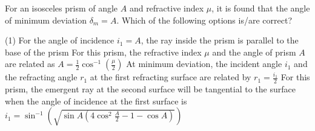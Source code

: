     \item For an isosceles prism of angle \( A \) and refractive index \( \mu \), it is found that the angle of minimum deviation \( \delta_m = A \). Which of the following options is/are correct?
        \begin{tasks}(1)
            \task For the angle of incidence \( i_1 = A \), the ray inside the prism is parallel to the base of the prism
            \task For this prism, the refractive index \( \mu \) and the angle of prism \( A \) are related as \( A = \frac{1}{2} \cos^{-1} \left( \frac{\mu}{2} \right) \)
            \task At minimum deviation, the incident angle \( i_1 \) and the refracting angle \( r_1 \) at the first refracting surface are related by \( r_1 = \frac{i_1}{2} \)
            \task For this prism, the emergent ray at the second surface will be tangential to the surface when the angle of incidence at the first surface is \( i_1 = \sin^{-1} \left( \sqrt{\sin A \left( 4 \cos^2 \frac{A}{2} - 1 - \cos A \right)} \right) \)
        \end{tasks}